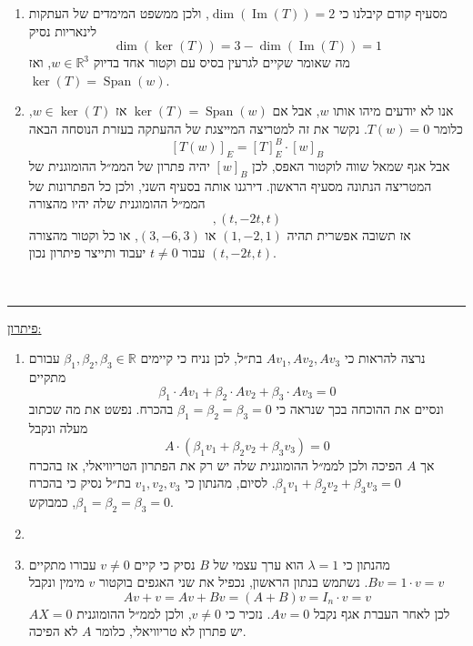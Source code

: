 \documentclass[12pt, a4paper]{article}
\newcommand{\rr}{\mathbb{R}}
\DeclareMathOperator{\Img}{Im}
\DeclareMathOperator{\Span}{Span}
\begin{document}
\begin{enumerate}
\begin{enumerate}
$$\begin{pmatrix}
\end{pmatrix},\begin{pmatrix}
    -3\\0\\1\\
\end{pmatrix}
\right\}$$
בסיס של
$\Img(T)$.
    \item 
מסעיף קודם קיבלנו כי
$\dim(\Img(T))=2$,
ולכן ממשפט המימדים של העתקות לינאריות נסיק
$$\dim(\ker(T))=3-\dim(\Img(T))=1$$
מה שאומר שקיים
לגרעין בסיס עם וקטור אחד בדיוק
$w\in\rr^3$,
ואז
$\ker(T)=\Span(w)$.
    \item 
   אנו לא יודעים מיהו אותו
   $w$,
   אבל אם
   $\ker(T)=\Span(w)$
   אז
   $w\in\ker(T)$,
   כלומר
   $T(w)=0$.
   נקשר את זה למטריצה המייצגת של ההעתקה בעזרת הנוסחה הבאה
   $$[T(w)]_E=[T]_E^B\cdot [w]_B$$
   אבל אגף שמאל שווה לוקטור האפס, לכן
   $[w]_B$
   יהיה פתרון של הממ״ל ההומוגנית של המטריצה הנתונה מסעיף הראשון. דירגנו אותה בסעיף השני, ולכן כל הפתרונות של הממ״ל ההומוגנית שלה יהיו מהצורה
   $$ 
       ,(t,-2t,t)
$$
   אז תשובה אפשרית תהיה
   $(1,-2,1)$
   או
   $(3,-6,3)$,
   או כל וקטור מהצורה 
   $(t,-2t,t)$
   עבור
   $t\neq0$
   יעבוד ותייצר פיתרון נכון.
\end{enumerate}

  \ \pagebreak

    \forthQ
    \noindent\rule{\textwidth-30pt}{0.4pt}
    \underline{פיתרון:}
\begin{enumerate}
    \item 
    נרצה להראות כי
    $Av_1,Av_2,Av_3$
    בת״ל, לכן נניח כי קיימים
    $\beta_1,\beta_2,\beta_3\in\rr$
    עבורם מתקיים
    $$\beta_1\cdot Av_1+\beta_2\cdot Av_2+\beta_3\cdot Av_3=0$$
    ונסיים את ההוכחה בכך שנראה כי
    $\beta_1=\beta_2=\beta_3=0$
    בהכרח.
    נפשט את מה שכתוב מעלה ונקבל
    $$A\cdot(\beta_1v_1+\beta_2v_2+\beta_3v_3)=0$$
    אך
    $A$
    הפיכה ולכן לממ״ל ההומוגנית שלה יש רק את הפתרון הטריוויאלי, אז בהכרח
    $\beta_1v_1+\beta_2v_2+\beta_3v_3=0$.
    לסיום, מהנתון כי
    $v_1,v_2,v_3$
    בת״ל נסיק כי בהכרח
    $\beta_1=\beta_2=\beta_3=0$,
    כמבוקש.
\item[] 
    \item 
    מהנתון כי
    $\lambda=1$
    הוא ערך עצמי של
    $B$
    נסיק כי קיים
    $v\neq 0$
    עבורו מתקיים
    $Bv=1\cdot v=v$.
    נשתמש בנתון הראשון, נכפיל את שני האגפים בוקטור
    $v$
    מימין ונקבל
    $$Av+v=Av+Bv=(A+B)v=I_n\cdot v=v$$
    לכן לאחר העברת אגף נקבל
    $Av=0$.
    נזכיר כי
    $v\neq0$,
    ולכן לממ״ל ההומוגנית 
    $AX=0$
    יש פתרון לא טריוויאלי, כלומר
    $A$
    לא הפיכה.
\end{enumerate}

    \pagebreak \ \pagebreak
\end{enumerate}
\end{document}
